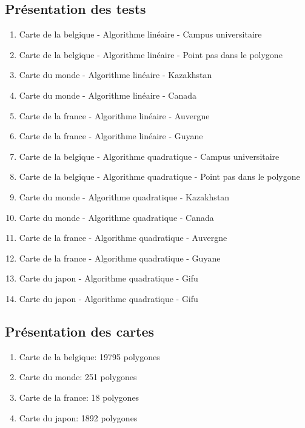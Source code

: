 \documentclass[utf8]{article}
\begin{document}
\begin{large}
    \subsection{Présentation des tests}
    \begin{enumerate}
        \item Carte de la belgique - Algorithme linéaire - Campus universitaire
        \item Carte de la belgique - Algorithme linéaire - Point pas dans le polygone
        \item Carte du monde - Algorithme linéaire - Kazakhstan
        \item Carte du monde - Algorithme linéaire - Canada
        \item Carte de la france - Algorithme linéaire - Auvergne
        \item Carte de la france - Algorithme linéaire - Guyane
        \item Carte de la belgique - Algorithme quadratique - Campus universitaire
        \item Carte de la belgique - Algorithme quadratique - Point pas dans le polygone
        \item Carte du monde - Algorithme quadratique - Kazakhstan
        \item Carte du monde - Algorithme quadratique - Canada
        \item Carte de la france - Algorithme quadratique - Auvergne
        \item Carte de la france - Algorithme quadratique - Guyane
        \item Carte du japon - Algorithme quadratique - Gifu
        \item Carte du japon - Algorithme quadratique - Gifu
    \end{enumerate}

    \subsection{Présentation des cartes}
    \begin{enumerate}
        \item Carte de la belgique: 19795 polygones
        \item Carte du monde: 251 polygones
        \item Carte de la france: 18 polygones
        \item Carte du japon: 1892 polygones
    \end{enumerate}


\end{large}
\end{document}
